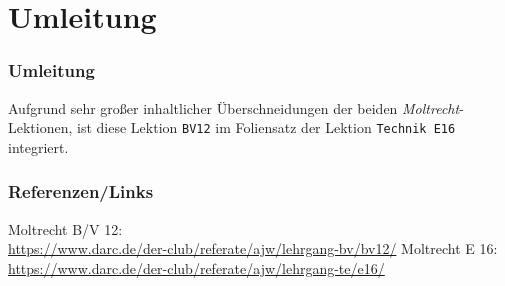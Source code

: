 

\subtitle{Betriebstechnik/Vorschriften 12: \\
  Digitale Betriebsarten \\[2em]}
\date{Stand 12.12.2016}


\section{Umleitung}

\begin{frame}
  \frametitle{Umleitung}

  Aufgrund sehr großer inhaltlicher Überschneidungen der beiden
  \emph{Moltrecht}-Lektionen, ist diese Lektion
  \texttt{BV12}\hyperlink{refs}{\cite{bv12}} im Foliensatz der Lektion
  \texttt{Technik E16}\hyperlink{refs}{\cite{e16}} integriert.

\end{frame}

\renewcommand{\refname}{Referenzen}

\begin{frame}
  \frametitle{Referenzen/Links}
  \hypertarget{refs}{}
  \footnotesize

  \begin{thebibliography}{}
      Moltrecht B/V 12: \\
      \url{https://www.darc.de/der-club/referate/ajw/lehrgang-bv/bv12/}
       Moltrecht E 16: \\
      \url{https://www.darc.de/der-club/referate/ajw/lehrgang-te/e16/}
  \end{thebibliography}

\end{frame}


